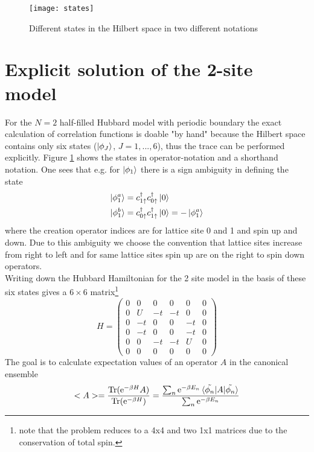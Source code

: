
	\begin{figure}[H]
		\centering
		\texttt{[image: states]} \qquad \qquad 
		\caption{Different states in the Hilbert space in two different notations}
		\label{fig1}
	\end{figure}
\section{Explicit solution of the 2-site model}
For the $N=2$ half-filled Hubbard model with periodic boundary the exact calculation of correlation functions is doable "by hand" because the Hilbert space contains only six states ($\ket{\phi_J}$, $J=1,...,6$), thus the trace can be performed explicitly. Figure \ref{fig1} shows the states in operator-notation and a shorthand notation. One sees that e.g. for $\ket{\phi_1}$ there is a sign ambiguity in defining the state
\begin{align*}
	\ket{\phi_1^a} &= c^{\dagger}_{1\uparrow}c^{\dagger}_{0\uparrow}\ket{0} \\
	\ket{\phi_1^b} &= c^{\dagger}_{0\uparrow}c^{\dagger}_{1\uparrow}\ket{0} = -\ket{\phi_1^a} 
\end{align*}
where the creation operator indices are for lattice site 0 and 1 and spin up and down. Due to this ambiguity we choose the convention that lattice sites increase from right to left and for same lattice sites spin up are on the right to spin down operators.\\ Writing down the Hubbard Hamiltonian for the 2 site model in the basis of these six states gives a $6\times6$ matrix\footnote{note that the problem reduces to a 4x4 and two 1x1 matrices due to the conservation of total spin.}
\begin{equation*}
	H=
\begin{pmatrix}
	0 & 0 & 0&0&0&0\\
	0 & U & -t&-t&0&0\\
	0 & -t & 0&0&-t&0\\
	0 & -t & 0&0&-t&0\\
	0 & 0 & -t&-t&U&0\\
	0 & 0 & 0&0&0&0 
\end{pmatrix}
\end{equation*}
The goal is to calculate expectation values of an operator $A$ in the canonical ensemble
\begin{equation}
	<A> = \frac{\text{Tr}(\text{e}^{-\beta H}A)}{\text{Tr}(\text{e}^{-\beta H})} = \frac{\sum_{n}^{}\text{e}^{-\beta E_n}\braket{\tilde{\phi_n}|A|\tilde{\phi_n}}}{\sum_{n}^{}\text{e}^{-\beta E_n}}\label{expvalue}
\end{equation}
